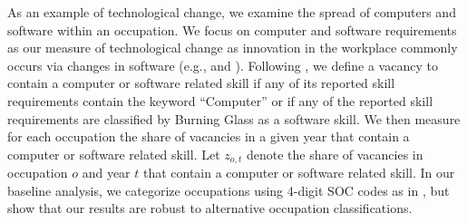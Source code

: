 \documentclass[12pt]{article}
\begin{document}
As an example of technological change, we examine the spread of computers and software within an occupation. We focus on computer and software requirements as our measure of technological change as innovation in the workplace commonly occurs via changes in software (e.g., \citet*{arora2013going} and \citet*{branstetter2019get}). Following \citet*{hershbein2018recessions}, we define a vacancy to contain a computer or software related skill if any of its reported skill requirements contain the keyword ``Computer'' or if any of the reported skill requirements are classified by Burning Glass as a software skill. We then measure for each occupation the share of vacancies in a given year that contain a computer or software related skill. Let $z_{o,t}$ denote the share of vacancies in occupation $o$ and year $t$ that contain a computer or software related skill. In our baseline analysis, we categorize occupations using 4-digit SOC codes as in \citet{hershbein2018recessions}, but show that our results are robust to alternative occupation classifications. 
\end{document}
